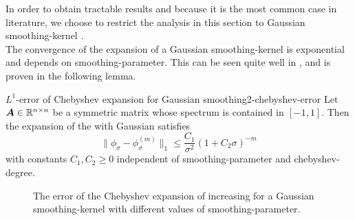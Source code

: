 In order to obtain tractable results and because it is the most common case in
literature, we choose to restrict the analysis in this section to Gaussian 
\gls{smoothing-kernel} .\\

The convergence of the expansion of a Gaussian \gls{smoothing-kernel} is exponential
and depends on \gls{smoothing-parameter}. This can be seen quite well
in , and is proven in the following
lemma.

\begin{lemma}{$L^1$-error of Chebyshev expansion for Gaussian smoothing}{2-chebyshev-error}
    Let $\boldsymbol{A} \in \mathbb{R}^{n \times n}$ be a symmetric matrix whose spectrum
    is contained in $[-1, 1]$. Then the expansion of the 
    with Gaussian  satisfies
    \begin{equation}
        \lVert  \phi_{\sigma} - \phi_{\sigma}^{(m)} \rVert _1 \leq \frac{C_1}{\sigma^2}(1 + C_2 \sigma)^{-m}
        \label{equ:2-chebyshev-interpolation-error}
    \end{equation}
    with constants $C_1, C_2 \geq 0$ independent of \gls{smoothing-parameter} and \gls{chebyshev-degree}.
\end{lemma}

\begin{figure}[ht]
    \centering
    
    \caption{The error of the Chebyshev expansion of increasing 
    for a Gaussian \gls{smoothing-kernel} with different values of \gls{smoothing-parameter}.}
    \label{fig:2-chebyshev-chebyshev-convergence}
\end{figure}

